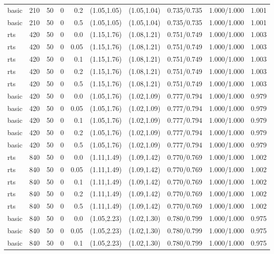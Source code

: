 \begin{tabular}{llrrrccccc}
basic & 210 & 50 & 0 & 0.2 & (1.05,1.05) & (1.05,1.04) & 0.735/0.735 & 1.000/1.000 & 1.001 \\
basic & 210 & 50 & 0 & 0.5 & (1.05,1.05) & (1.05,1.04) & 0.735/0.735 & 1.000/1.000 & 1.001 \\
rts & 420 & 50 & 0 & 0.0 & (1.15,1.76) & (1.08,1.21) & 0.751/0.749 & 1.000/1.000 & 1.003 \\
rts & 420 & 50 & 0 & 0.05 & (1.15,1.76) & (1.08,1.21) & 0.751/0.749 & 1.000/1.000 & 1.003 \\
rts & 420 & 50 & 0 & 0.1 & (1.15,1.76) & (1.08,1.21) & 0.751/0.749 & 1.000/1.000 & 1.003 \\
rts & 420 & 50 & 0 & 0.2 & (1.15,1.76) & (1.08,1.21) & 0.751/0.749 & 1.000/1.000 & 1.003 \\
rts & 420 & 50 & 0 & 0.5 & (1.15,1.76) & (1.08,1.21) & 0.751/0.749 & 1.000/1.000 & 1.003 \\
basic & 420 & 50 & 0 & 0.0 & (1.05,1.76) & (1.02,1.09) & 0.777/0.794 & 1.000/1.000 & 0.979 \\
basic & 420 & 50 & 0 & 0.05 & (1.05,1.76) & (1.02,1.09) & 0.777/0.794 & 1.000/1.000 & 0.979 \\
basic & 420 & 50 & 0 & 0.1 & (1.05,1.76) & (1.02,1.09) & 0.777/0.794 & 1.000/1.000 & 0.979 \\
basic & 420 & 50 & 0 & 0.2 & (1.05,1.76) & (1.02,1.09) & 0.777/0.794 & 1.000/1.000 & 0.979 \\
basic & 420 & 50 & 0 & 0.5 & (1.05,1.76) & (1.02,1.09) & 0.777/0.794 & 1.000/1.000 & 0.979 \\
rts & 840 & 50 & 0 & 0.0 & (1.11,1.49) & (1.09,1.42) & 0.770/0.769 & 1.000/1.000 & 1.002 \\
rts & 840 & 50 & 0 & 0.05 & (1.11,1.49) & (1.09,1.42) & 0.770/0.769 & 1.000/1.000 & 1.002 \\
rts & 840 & 50 & 0 & 0.1 & (1.11,1.49) & (1.09,1.42) & 0.770/0.769 & 1.000/1.000 & 1.002 \\
rts & 840 & 50 & 0 & 0.2 & (1.11,1.49) & (1.09,1.42) & 0.770/0.769 & 1.000/1.000 & 1.002 \\
rts & 840 & 50 & 0 & 0.5 & (1.11,1.49) & (1.09,1.42) & 0.770/0.769 & 1.000/1.000 & 1.002 \\
basic & 840 & 50 & 0 & 0.0 & (1.05,2.23) & (1.02,1.30) & 0.780/0.799 & 1.000/1.000 & 0.975 \\
basic & 840 & 50 & 0 & 0.05 & (1.05,2.23) & (1.02,1.30) & 0.780/0.799 & 1.000/1.000 & 0.975 \\
basic & 840 & 50 & 0 & 0.1 & (1.05,2.23) & (1.02,1.30) & 0.780/0.799 & 1.000/1.000 & 0.975 \\

\end{tabular}
